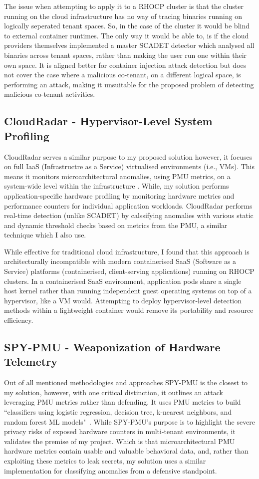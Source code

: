 \documentclass[11pt,a4paper, notitlepage]{article}
\begin{document}
The issue when attempting to apply it to a RHOCP cluster is that the cluster running on the cloud infrastructure has no way of tracing 
binaries running on logically seperated tenant spaces. So, in the case of the cluster it would be blind to external container runtimes. 
The only way it would be able to, is if the cloud providers themselves implemented a master SCADET detector which analysed all binaries across tenant spaces, rather than making the user run one within their own space. 
It is aligned better for container injection attack detection but does not cover the case where a malicious co-tenant, on a different logical space, is 
performing an attack, making it unsuitable for the proposed problem of detecting malicious co-tenant activities.

\subsection{CloudRadar - Hypervisor-Level System Profiling}
CloudRadar serves a similar purpose to my proposed solution however, it focuses on full IaaS (Infrastructre as a Service) virtualised environments (i.e., VMs).
This means it monitors microarchitectural anomalies, using PMU metrics, on a system-wide level within the infrastructure \cite{cloudradar}. While, my solution performs application-specific hardware profiling 
by monitoring hardware metrics and performance counters for individual application workloads. 
CloudRadar performs real-time detection (unlike SCADET) by calssifying anomalies with various static and dynamic threshold checks based on metrics from the PMU, a similar technique which I also use.

While effective for traditional cloud infrastructure, I found that this approach is architecturally incompatible with modern containerised SaaS (Software as a Service) platforms (containerised, client-serving applications) running on RHOCP clusters. 
In a containerised SaaS environment, application pods share a single host kernel rather than running independent guest operating systems on top of a hypervisor, like a VM would. 
Attempting to deploy hypervisor-level detection methods within a lightweight container would remove its portability and resource efficiency. 

\subsection{SPY-PMU - Weaponization of Hardware Telemetry}
Out of all mentioned methodologies and approaches SPY-PMU is the closest to my solution, however, with one critical distinction, it outlines an attack leveraging PMU metrics rather than defending. It uses PMU metrics to build ``classifiers using logistic regression, decision tree, k-nearest neighbors, and random forest ML models"~\cite{spypmu}. 
While SPY-PMU's purpose is to highlight the severe privacy risks of exposed hardware counters in multi-tenant environments, it validates the premise of my 
project. Which is that microarchitectural PMU hardware metrics contain usable and valuable behavioral data, and, rather than exploiting these metrics to leak secrets, my solution 
uses a similar implementation for classifying anomalies from a defensive standpoint.
\end{document}
